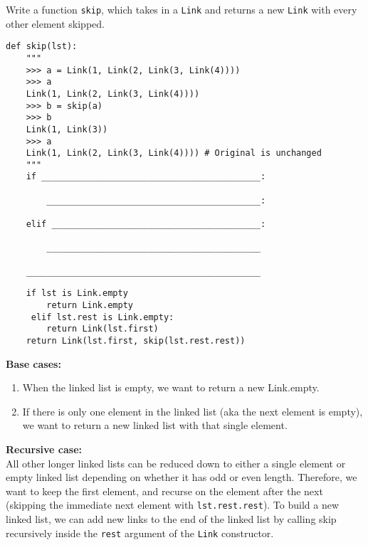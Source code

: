 \begin{blocksection}
\question Write a function \texttt{skip}, which takes in a \texttt{Link} and returns a new \texttt{Link} with every other element skipped.

\begin{lstlisting}
def skip(lst):
    """
    >>> a = Link(1, Link(2, Link(3, Link(4))))
    >>> a
    Link(1, Link(2, Link(3, Link(4))))
    >>> b = skip(a)
    >>> b
    Link(1, Link(3))
    >>> a
    Link(1, Link(2, Link(3, Link(4)))) # Original is unchanged
    """
    if ___________________________________________:
		
        __________________________________________:
				
    elif _________________________________________:
		
        __________________________________________
				
    ______________________________________________
\end{lstlisting}
\begin{solution}[0.6in]
\begin{lstlisting}
    if lst is Link.empty 
    	return Link.empty
     elif lst.rest is Link.empty:
        return Link(lst.first)
    return Link(lst.first, skip(lst.rest.rest))
\end{lstlisting}
\textbf{Base cases:}
\begin{enumerate}
\item When the linked list is empty, we want to return a new Link.empty.
\item If there is only one element in the linked list (aka the next element is empty), we want to return a new linked list with that single element. 
\end{enumerate}
\textbf{Recursive case:} \\
All other longer linked lists can be reduced down to either a single element or empty linked list depending on whether it has odd or even length. Therefore, we want to keep the first element, and recurse on the element after the next (skipping the immediate next element with \lstinline{lst.rest.rest}). To build a new linked list, we can add new links to the end of the linked list by calling skip recursively inside the \lstinline{rest} argument of the \lstinline{Link} constructor. 

\end{solution}
\end{blocksection}
